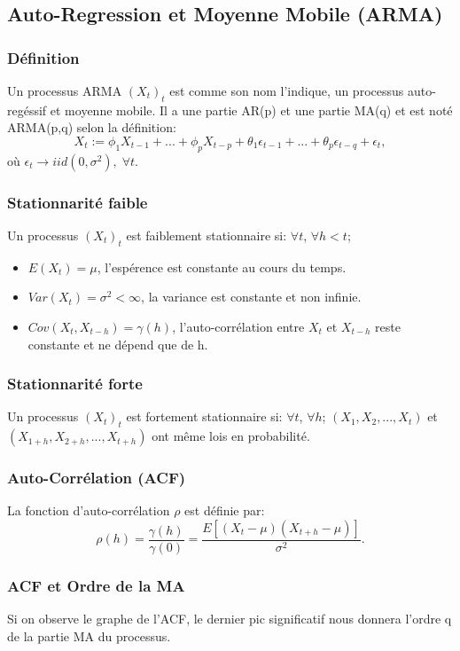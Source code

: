 \documentclass{article}
\begin{document}
\subsection{Auto-Regression et Moyenne Mobile (ARMA)}

\subsubsection{Définition}
Un processus ARMA $(X_t)_t$ est comme son nom l'indique, un processus auto-regéssif et moyenne mobile. Il a une partie AR(p) et une partie MA(q) et est noté ARMA(p,q) selon la définition:
$$X_t:=\phi_1{X_{t-1}}+...+\phi_p{X_{t-p}}+\theta_1{\epsilon_{t-1}}+...+\theta_p{\epsilon_{t-q}}+\epsilon_t,$$
où $\epsilon_t \rightarrow iid(0,\sigma^2), \; \forall t$.

\subsubsection{Stationnarité faible}
Un processus $(X_t)_t$ est faiblement stationnaire si: $\forall t$, $\forall h<t$;
\begin{itemize}
\item $E(X_t)=\mu$, l'espérence est constante au cours du temps.
\item $Var(X_t)=\sigma^2<\infty$, la variance est constante et non infinie.
\item $Cov(X_t,X_{t-h})=\gamma(h)$, l'auto-corrélation entre $X_t$ et $X_{t-h}$ reste constante et ne dépend que de h.
\end{itemize}

\subsubsection{Stationnarité forte}
Un processus $(X_t)_t$ est fortement stationnaire si: $\forall t$, $\forall h$; $(X_1,X_2,...,X_t)$ et $(X_{1+h},X_{2+h},...,X_{t+h})$ ont même lois en probabilité.

\subsubsection{Auto-Corrélation (ACF)}
La fonction d'auto-corrélation $\rho$ est définie par:
$$\rho(h)=\frac{\gamma(h)}{\gamma(0)}=\frac{E[(X_t-\mu)(X_{t+h}-\mu)]}{\sigma^2}.$$

\subsubsection{ACF et Ordre de la MA}
Si on observe le graphe de l'ACF, le dernier pic significatif nous donnera l'ordre q de la partie MA du processus.
\end{document}
